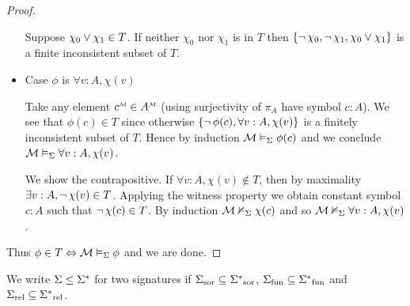 \begin{proof}
\begin{itemize}
            \begin{backward}
                Suppose $\chi_0 \lor \chi_1 \in T$.
                If neither $\chi_0$ nor $\chi_1$ is in $T$ then
                $\left\{\neg\, \chi_0, \neg\, \chi_1, \chi_0 \lor \chi_1\right\}$
                is a finite inconsistent subset of $T$.
            \end{backward}

        \item Case $\phi$ is $\forall v : A, \chi(v)$
            \begin{forward}
                Take any element $\mmintp{c} \in \mmintp{A}$
                (using surjectivity of $\pi_A$ have symbol $c : A$).
                We see that $\phi(c) \in T$ since otherwise 
                $\left\{\neg\, \phi(c), \forall v : A, \chi(v)\right\}$ is a 
                finitely inconsistent subset of $T$.
                Hence by induction $\mathcal{M} \vDash_{\Sigma} \phi(c)$ 
                and we conclude $\mathcal{M} \vDash_{\Sigma} \forall v : A, \chi(v)$.
            \end{forward}

            \begin{backward}
                We show the contrapositive.
                If $\forall v : A, \chi(v) \notin T$, 
                then by maximality $\exists v : A, \neg\, \chi(v) \in T$.
                Applying the witness property we obtain constant symbol 
                $c : A$ such that $\neg\, \chi(c) \in T$.
                By induction $\mathcal{M} \nvDash_{\Sigma} \chi(c)$ and so 
                $\mathcal{M} \nvDash_{\Sigma} \forall v:A, \chi(v)$.
            \end{backward}
    \end{itemize}
    Thus $\phi \in T \Leftrightarrow \mathcal{M} \vDash_{\Sigma} \phi$ and we are done.
\end{proof}

\begin{nttn}
    We write $\Sigma \leq \Sigma^*$ for two signatures if
    ${\Sigma}_\mathrm{sor} \subseteq {\Sigma^*}_\mathrm{sor}$,
    ${\Sigma}_\mathrm{fun} \subseteq {\Sigma^*}_\mathrm{fun}$ and ${\Sigma}_\mathrm{rel} \subseteq {\Sigma^*}_\mathrm{rel}$.
\end{nttn}

